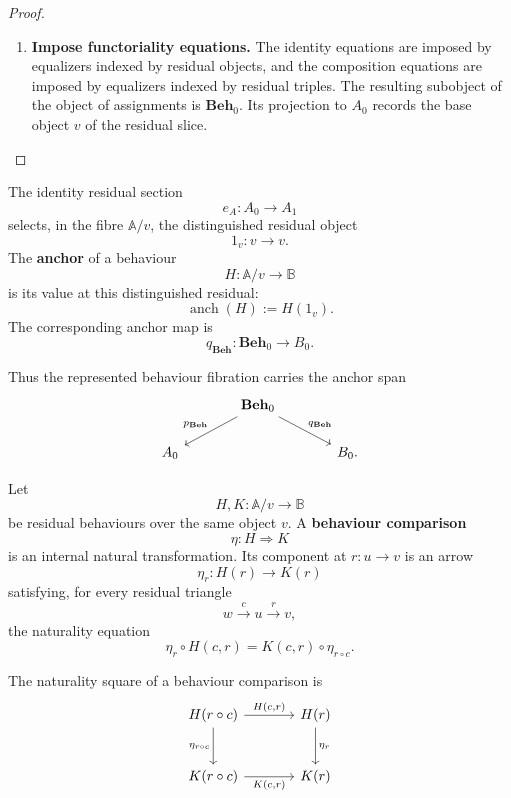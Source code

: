 \begin{proof}
\begin{enumerate}
        \item \textbf{Impose functoriality equations.} The identity equations are imposed by equalizers indexed by residual objects, and the composition equations are imposed by equalizers indexed by residual triples. The resulting subobject of the object of assignments is \(\mathbf{Beh}_0\). Its projection to \(A_0\) records the base object \(v\) of the residual slice.
    \end{enumerate}
\end{proof}

\begin{definition}
\label{def:anchor-evaluation}
    The identity residual section
    \[
        e_A:A_0\to A_1
    \]
    selects, in the fibre \(\mathbb A/v\), the distinguished residual object
    \[
        1_v:v\to v.
    \]
    The \textbf{anchor} of a behaviour
    \[
        H:\mathbb A/v\to\mathbb B
    \]
    is its value at this distinguished residual:
    \[
        \operatorname{anch}(H):=H(1_v).
    \]
    The corresponding anchor map is
    \[
        q_{\mathbf{Beh}}:\mathbf{Beh}_0\to B_0.
    \]
\end{definition}

Thus the represented behaviour fibration carries the anchor span
\[
    \begin{tikzcd}[column sep=large]
        &
            \mathbf{Beh}_0
                \arrow[dl, "p_{\mathbf{Beh}}"']
                \arrow[dr, "q_{\mathbf{Beh}}"]
        &
        \\
            A_0
        &
        &
            B_0.
    \end{tikzcd}
\]

\begin{definition}
\label{def:behaviour-comparison}
    Let
    \[
        H,K:\mathbb A/v\to\mathbb B
    \]
    be residual behaviours over the same object \(v\). A \textbf{behaviour comparison}
    \[
        \eta:H\Rightarrow K
    \]
    is an internal natural transformation. Its component at \(r:u\to v\) is an arrow
    \[
        \eta_r:H(r)\to K(r)
    \]
    satisfying, for every residual triangle
    \[
        w\xrightarrow{c}u\xrightarrow{r}v,
    \]
    the naturality equation
    \[
        \eta_r\circ H(c,r)
        =
        K(c,r)\circ\eta_{r\circ c}.
    \]
\end{definition}

The naturality square of a behaviour comparison is
\[
    \begin{tikzcd}[column sep=large, row sep=large]
            H(r\circ c)
                \arrow{r}{H(c,r)}
                \arrow{d}[swap]{\eta_{r\circ c}}
        &
            H(r)
                \arrow{d}{\eta_r}
        \\
            K(r\circ c)
                \arrow{r}[swap]{K(c,r)}
        &
            K(r)
    \end{tikzcd}
\]

